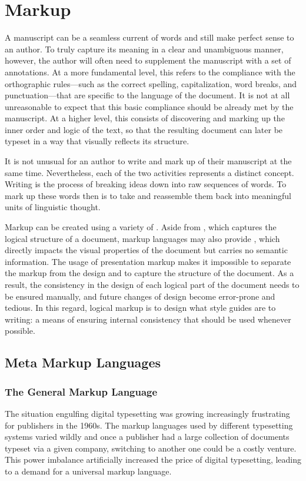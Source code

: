 \chapter{Markup}
A manuscript can be a seamless current of words and still make perfect sense to
an author. To truly capture its meaning in a clear and unambiguous manner,
however, the author will often need to supplement the manuscript with a set of
annotations. At a more fundamental level, this refers to the compliance with the
orthographic rules---such as the correct spelling, capitalization, word breaks,
and punctuation---that are specific to the language of the document. It is not
at all unreasonable to expect that this basic compliance should be already met
by the manuscript. At a higher level, this consists of discovering and marking
up the inner order and logic of the text, so that the resulting document can
later be typeset in a way that visually reflects its structure.

It is not unusual for an author to write and mark up of their manuscript at the
same time. Nevertheless, each of the two activities represents a distinct
concept. Writing is the process of breaking ideas down into raw sequences of
words. To mark up these words then is to take and reassemble them back into
meaningful units of linguistic thought.

Markup can be created using a variety of . Aside from
, which captures the logical structure of a document,
markup languages may also provide , which directly
impacts the visual properties of the document but carries no semantic
information. The usage of presentation markup makes it impossible to separate
the markup from the design and to capture the structure of the document. As a
result, the consistency in the design of each logical part of the document needs
to be ensured manually, and future changes of design become error-prone and
tedious. In this regard, logical markup is to design what style guides are to
writing: a means of ensuring internal consistency that should be used whenever
possible.

\section{Meta Markup Languages}
\subsection{The General Markup Language}
The situation engulfing digital typesetting was growing increasingly frustrating
for publishers in the 1960s. The markup languages used by different typesetting
systems varied wildly and once a publisher had a large collection of documents
typeset via a given company, switching to another one could be a costly
venture. This power imbalance artificially increased the price of digital
typesetting, leading to a demand for a universal markup language.

